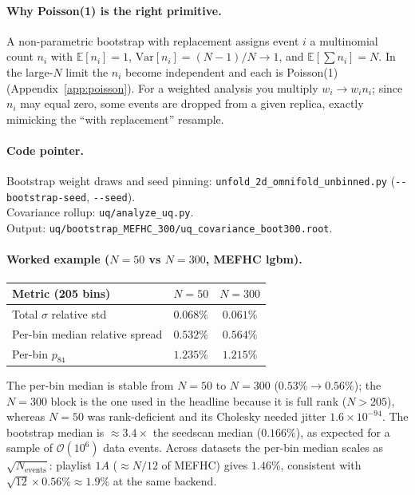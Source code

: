 \paragraph{Why Poisson(1) is the right primitive.}
A non-parametric bootstrap with replacement assigns event $i$ a
multinomial count $n_{i}$ with $\mathbb{E}[n_{i}]=1$,
$\mathrm{Var}[n_{i}] = (N-1)/N \to 1$, and $\mathbb{E}[\sum n_{i}] =
N$. In the large-$N$ limit the $n_{i}$ become independent and each is
Poisson(1) (Appendix~\ref{app:poisson}). For a weighted analysis you
multiply $w_{i}\to w_{i}n_{i}$; since $n_{i}$ may equal zero,
some events are dropped from a given replica, exactly mimicking the
``with replacement'' resample.

\paragraph{Code pointer.}
Bootstrap weight draws and seed pinning:
\texttt{unfold\_2d\_omnifold\_unbinned.py} (\texttt{-{}-bootstrap-seed},
\texttt{-{}-seed}).\\
Covariance rollup: \texttt{uq/analyze\_uq.py}.\\
Output: \texttt{uq/bootstrap\_MEFHC\_300/uq\_covariance\_boot300.root}.

\paragraph{Worked example ($N=50$ vs $N=300$, MEFHC lgbm).}
\begin{center}
\begin{tabular}{@{}lcc@{}}
\toprule
Metric (205 bins) & $N=50$ & $N=300$ \\
\midrule
Total $\sigma$ relative std & $0.068\%$ & $\boxed{0.061\%}$ \\
Per-bin median relative spread & $0.532\%$ & $\boxed{0.564\%}$ \\
Per-bin $p_{84}$ & $1.235\%$ & $1.215\%$ \\
\bottomrule
\end{tabular}
\end{center}
The per-bin median is stable from $N=50$ to $N=300$ ($0.53\%\to
0.56\%$); the $N=300$ block is the one used in the headline because it
is full rank ($N>205$), whereas $N=50$ was rank-deficient and its
Cholesky needed jitter $1.6\times 10^{-94}$. The bootstrap median is
$\approx 3.4\times$ the seedscan median ($0.166\%$), as expected for a
sample of $\mathcal{O}(10^{6})$ data events. Across datasets the
per-bin median scales as $\sqrt{N_{\text{events}}}$: playlist $1A$
($\approx N/12$ of MEFHC) gives $1.46\%$, consistent with
$\sqrt{12}\times 0.56\% \approx 1.9\%$ at the same backend.

